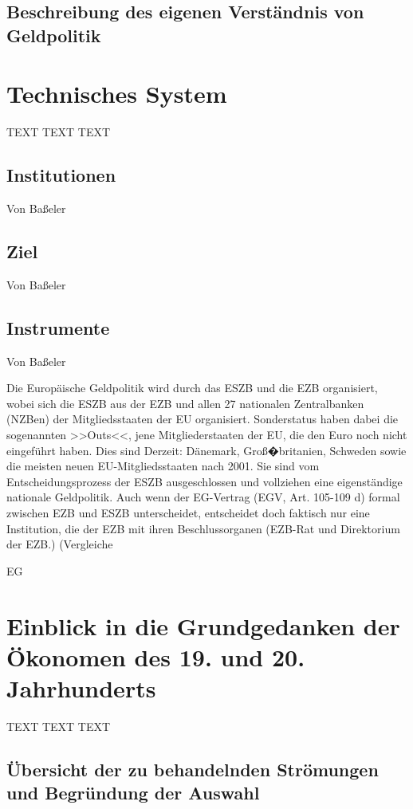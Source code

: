 \documentclass[
onecolumn,
a4paper,
abstracton,
parskip=half
,final
]{scrartcl}
\begin{document}
\subsection{Beschreibung des eigenen Verst{\"a}ndnis von Geldpolitik}

\clearpage

\section{Technisches System}
\label{sec1:technischesSystem}
TEXT TEXT TEXT
\subsection{Institutionen} Von Ba{\ss}eler
\subsection{Ziel}  Von Ba{\ss}eler
\subsection{Instrumente}  Von Ba{\ss}eler

Die Europ{\"a}ische Geldpolitik wird durch das \ac{ESZB} und die \ac{EZB} organisiert, wobei sich die \ac{ESZB} aus der \acf{EZB} und allen 27 nationalen Zentralbanken (NZBen) der Mitgliedsstaaten der \ac{EU} organisiert. Sonderstatus haben dabei die sogenannten >>Outs<<, jene Mitgliederstaaten der \ac{EU}, die den Euro noch nicht eingef{\"u}hrt haben. Dies sind Derzeit: D{\"a}nemark, Gro{\ss}�britanien, Schweden sowie die meisten neuen \acs{EU}-Mitgliedsstaaten nach 2001. Sie sind vom Entscheidungsprozess der \ac{ESZB} ausgeschlossen und vollziehen eine eigenst{\"a}ndige nationale Geldpolitik. Auch wenn der \acs{EG}-Vertrag (EGV, Art. 105-109 d) formal zwischen \ac{EZB} und \ac{ESZB} unterscheidet, entscheidet doch faktisch nur eine Institution, die der \ac{EZB} mit ihren Beschlussorganen (EZB-Rat und Direktorium der \ac{EZB}.) (Vergleiche


\clearpage


\ac{EG}



\section{Einblick in die Grundgedanken der {\"O}konomen des 19. und 20. Jahrhunderts}
\label{sec1:stroemungen}
TEXT TEXT TEXT


\subsection{{\"U}bersicht der zu behandelnden Str{\"o}mungen und Begr{\"u}ndung der Auswahl}
\end{document}
